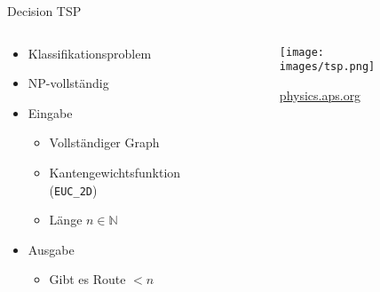 \begin{frame}{Decision TSP}
\begin{columns}
    \begin{column}{0.5\textwidth}
        \begin{itemize}
            \item Klassifikationsproblem
            \item NP-vollständig
            \item Eingabe
            \begin{itemize}
                \item Vollständiger Graph
                \item Kantengewichtsfunktion (\texttt{EUC\_2D})
                \item Länge $n \in \mathbb{N} $
            \end{itemize}
            \item Ausgabe
            \begin{itemize}
                \item Gibt es Route $< n$
            \end{itemize}
        \end{itemize}
    \end{column}
    \begin{column}{0.5\textwidth}
        \begin{figure}
            \centering
            \texttt{[image: images/tsp.png]}
            \caption{\href{https://physics.aps.org/articles/v10/s32
}{physics.aps.org}}
            \label{fig:enter-label}
        \end{figure}
    \end{column}
\end{columns}
\end{frame}




